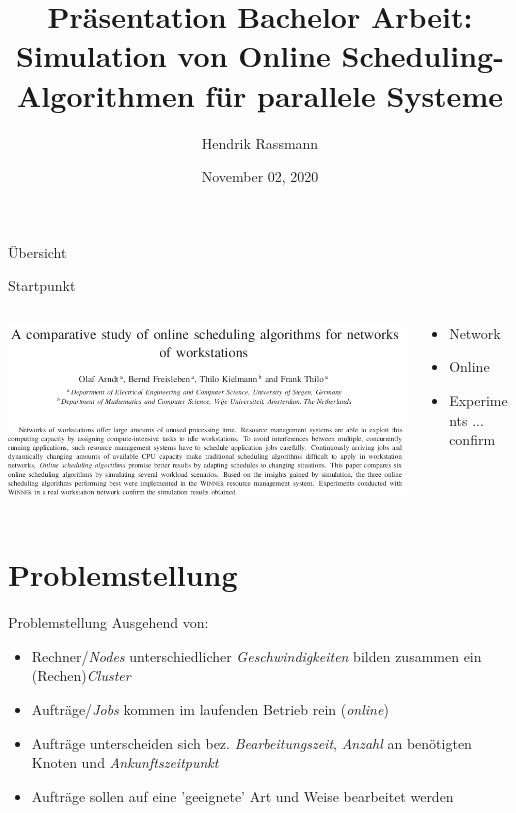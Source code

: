 \documentclass[aspectratio=169,10pt]{beamer}
\title{Pr\"asentation Bachelor Arbeit:\\
 Simulation von Online Scheduling-Algorithmen f\"ur parallele Systeme}
\author{Hendrik Rassmann}
\institute{TU Dortmund University - Department of Computer Science}
\date{November 02, 2020}
\begin{document}
\maketitle
\Large

\begin{frame}{\"Ubersicht}
\tableofcontents
\end{frame}


\begin{frame}[fragile]{Startpunkt}

\begin{columns}
	\begin{column}{0.57\paperwidth}
		\vspace{0.5pt}
		\includegraphics[width=\linewidth, clip]{images/Arndt}
	\end{column}
	\begin{column}[c]{0.43\paperwidth}
		\begin{itemize}
			\item \alert{Network}
			\item \alert{Online}
			\item \alert{Experiments} ... \alert{confirm}
		\end{itemize}
	\end{column}
\end{columns}
\end{frame}
\section{Problemstellung}


\begin{frame}[t,fragile]{Problemstellung}
Ausgehend von:

\begin{itemize}[<+->]
	\item Rechner/\emph{Nodes} unterschiedlicher \emph{Geschwindigkeiten} bilden zusammen ein (Rechen)\emph{Cluster} 
	\item Auftr\"age/\emph{Jobs} kommen im laufenden Betrieb rein (\emph{online})
	\item Auftr\"age unterscheiden sich bez. \emph{Bearbeitungszeit}, \emph{Anzahl} an ben\"otigten Knoten und \emph{Ankunftszeitpunkt}
	\item Auftr\"age sollen auf eine 'geeignete' Art und Weise bearbeitet werden
\end{itemize}
\end{frame}
\end{document}

